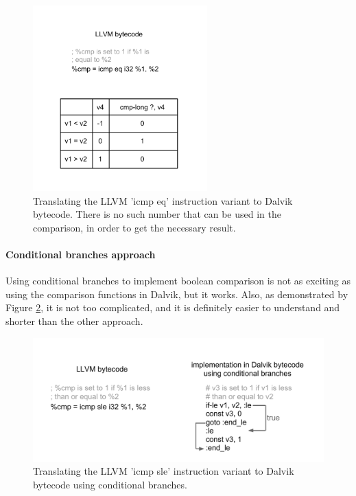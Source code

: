 \documentclass[parskip]{cs4rep}
\begin{document}
\begin{figure}[h!]
    \centering
        \includegraphics[width=0.6\textwidth]{cmpeq}
    \caption{Translating the LLVM 'icmp eq' instruction variant to Dalvik bytecode. There is no such number that can be used in the comparison, in order to get the necessary result.}
    \label{fig:cmpeq}
\end{figure}

\paragraph{Conditional branches approach} Using conditional branches to implement boolean comparison is not as exciting as using the comparison functions in Dalvik, but it works. Also, as demonstrated by Figure \ref{fig:cmpsle2}, it is not too complicated, and it is definitely easier to understand and shorter than the other approach.

\begin{figure}[h!]
    \centering
        \includegraphics[width=1.0\textwidth]{cmpsle2}
    \caption{Translating the LLVM 'icmp sle' instruction variant to Dalvik bytecode using conditional branches.}
    \label{fig:cmpsle2}
\end{figure}
\end{document}
